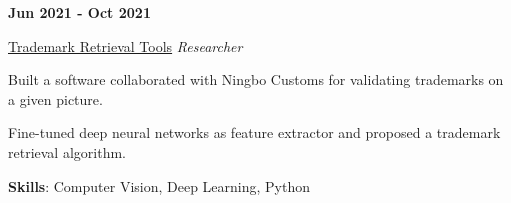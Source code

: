 \documentclass[9pt,a4paper]{article} %
\newenvironment{itemize-noindent}
{
\setlength{\leftmargini}{1em}
\begin{itemize}
\setlength{\itemsep}{0pt}
\setlength{\parskip}{0pt}
}
{\end{itemize}}
\begin{document}
\begin{multicols}{2}

\textbf{Jun 2021 - Oct 2021}

\href{https://github.com/Stx666Michael/logo_retrieval}{Trademark Retrieval Tools} \hfill \textit{Researcher}

\begin{itemize-noindent}
    \item Built a software collaborated with Ningbo Customs for validating trademarks on a given picture.
    \item Fine-tuned deep neural networks as feature extractor and proposed a trademark retrieval algorithm.
    \item \textbf{Skills}: Computer Vision, Deep Learning, Python
\end{itemize-noindent}

\end{multicols}
\end{document}

